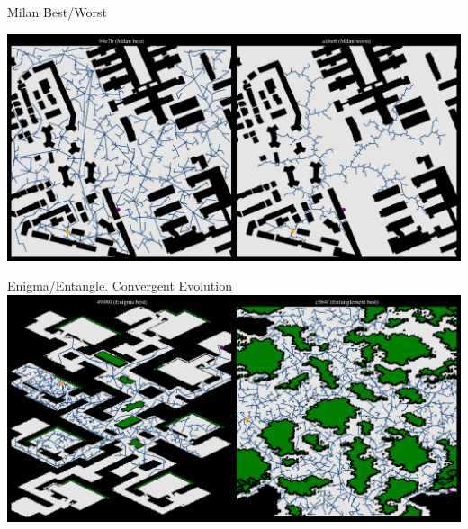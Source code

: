 \documentclass[aspectratio=169]{beamer}
\begin{document}
\begin{frame}{Milan Best/Worst}
    
    \includegraphics[width=1.0\linewidth, keepaspectratio]{figures/learned_split_0.pdf}
\end{frame}

\begin{frame}{Enigma/Entangle. Convergent Evolution}
    \centering
    \vspace{-0.1}
    \includegraphics[width=1.0\linewidth, keepaspectratio]{figures/learned_split_1.pdf}
\end{frame}
\end{document}
